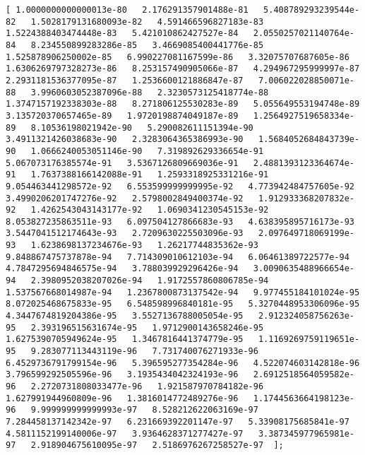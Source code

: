 \documentclass[11pt]{article}
\begin{document}
\begin{Verbatim}[commandchars=\\\{\}]
[ 1.0000000000000013e-80   2.176291357901488e-81   5.408789293239544e-82   1.5028179131680093e-82   4.591466596827183e-83   1.5224388403474448e-83   5.421010862427527e-84   2.0550257021140764e-84   8.234550899283286e-85   3.4669085400441776e-85   1.525878906250002e-85   6.990227081167599e-86   3.32075707687605e-86   1.6306269797328273e-86   8.253157490905066e-87   4.294967295999997e-87   2.2931181536377095e-87   1.2536600121886847e-87   7.006022028850071e-88   3.9960603052387096e-88   2.3230573125418774e-88   1.3747157192338303e-88   8.271806125530283e-89   5.055649553194748e-89   3.135720370657465e-89   1.9720198874049187e-89   1.2564927519658334e-89   8.10536198021942e-90   5.290082611151394e-90   3.4911321426038683e-90   2.3283064365386993e-90   1.5684052684843739e-90   1.0666240053051146e-90   7.319892629336654e-91   5.067073176385574e-91   3.5367126809669036e-91   2.4881393123364674e-91   1.7637388166142088e-91   1.2593318925331216e-91   9.054463441298572e-92   6.553599999999995e-92   4.773942484757605e-92   3.4990206201747276e-92   2.5798002849400374e-92   1.912933368207832e-92   1.4262543043143177e-92   1.0690341230545153e-92   8.053827235863511e-93   6.097504127866683e-93   4.638395895716173e-93   3.5447041512174643e-93   2.7209630225503096e-93   2.097649718069199e-93   1.6238698137234676e-93   1.26217744835362e-93   9.848867475737878e-94   7.714309010612103e-94   6.06461389722577e-94   4.7847295694846575e-94   3.788039929296426e-94   3.0090635488966654e-94   2.3980952038207026e-94   1.9172557860806785e-94   1.537567668014987e-94   1.2367800873137542e-94   9.977455184101024e-95   8.072025468675833e-95   6.548598996840181e-95   5.3270448953306096e-95   4.3447674819204386e-95   3.5527136788005054e-95   2.912324058756263e-95   2.393196515631674e-95   1.9712900143658246e-95   1.6275390705949624e-95   1.3467816441374779e-95   1.1169269759119651e-95   9.283077113443119e-96   7.731740076271933e-96   6.4529736791799154e-96   5.396595277354284e-96   4.522074603142818e-96   3.796599292505596e-96   3.1935434042324193e-96   2.6912518564059582e-96   2.2720731808033477e-96   1.921587970784182e-96   1.627991944960809e-96   1.3816014772489276e-96   1.1744563664198123e-96   9.999999999999993e-97   8.528212622063169e-97   7.284458137142342e-97   6.231669392201147e-97   5.33908175685841e-97   4.5811152199140006e-97   3.9364628371277427e-97   3.387345977965981e-97   2.918904675610095e-97   2.5186976267258527e-97  ];

\end{Verbatim}
\end{document}
